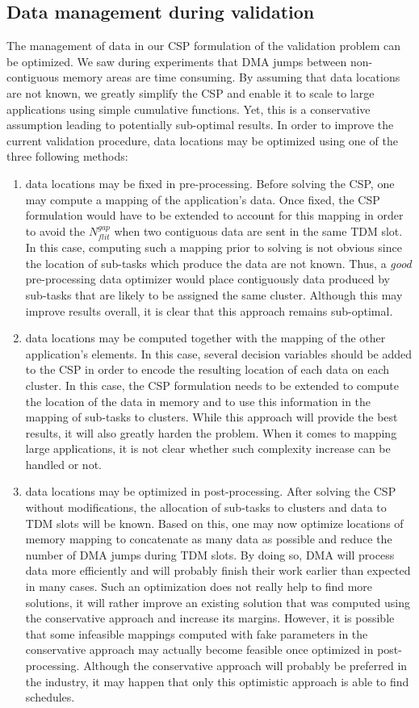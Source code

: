 \documentclass[main.tex]{subfiles}
\begin{document}
\subsection{Data management during validation}
The management of data in our CSP formulation of the validation problem can be optimized. We saw during experiments that DMA jumps between non-contiguous memory areas are time consuming. By assuming that data locations are not known, we greatly simplify the CSP and enable it to scale to large applications using simple cumulative functions. Yet, this is a conservative assumption leading to potentially sub-optimal results. In order to improve the current validation procedure, data locations may be optimized using one of the three following methods: 
\begin{enumerate}
    \item data locations may be fixed in pre-processing. Before solving the CSP, one may compute a mapping of the application's data. Once fixed, the CSP formulation would have to be extended to account for this mapping in order to avoid the $N_{flit}^{gap}$ when two contiguous data are sent in the same TDM slot. In this case, computing such a mapping prior to solving is not obvious since the location of sub-tasks which produce the data are not known. Thus, a \emph{good} pre-processing data optimizer would place contiguously data produced by sub-tasks that are likely to be assigned the same cluster. Although this may improve results overall, it is clear that this approach remains sub-optimal.
    \item data locations may be computed together with the mapping of the other application's elements. In this case, several decision variables should be added to the CSP in order to encode the resulting location of each data on each cluster. In this case, the CSP formulation needs to be extended to compute the location of the data in memory and to use this information in the mapping of sub-tasks to clusters. While this approach will provide the best results, it will also greatly harden the problem. When it comes to mapping large applications, it is not clear whether such complexity increase can be handled or not.
    \item data locations may be optimized in post-processing. After solving the CSP without modifications, the allocation of sub-tasks to clusters and data to TDM slots will be known. Based on this, one may now optimize locations of memory mapping to concatenate as many data as possible and reduce the number of DMA jumps during TDM slots. By doing so, DMA will process data more efficiently and will probably finish their work earlier than expected in many cases. Such an optimization does not really help to find more solutions, it will rather improve an existing solution that was computed using the conservative approach and increase its margins. However, it is possible that some infeasible mappings computed with fake parameters in the conservative approach may actually become feasible once optimized in post-processing. Although the conservative approach will probably be preferred in the industry, it may happen that only this optimistic approach is able to find schedules.
\end{enumerate}
\end{document}
